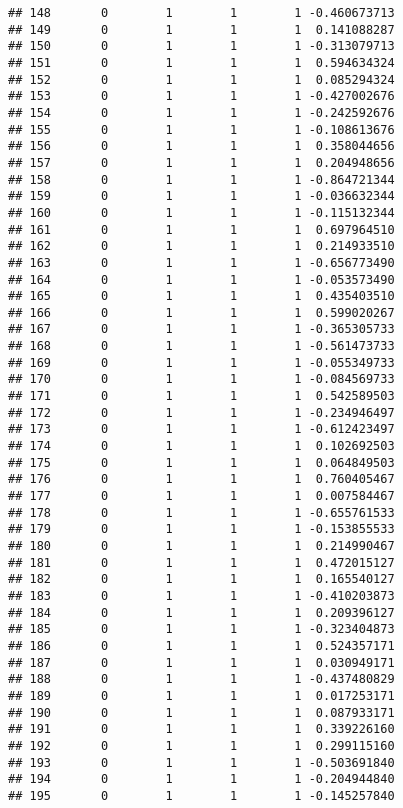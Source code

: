 \documentclass[]{book}
\theoremstyle{definition}
\theoremstyle{definition}
\theoremstyle{definition}
\theoremstyle{remark}
\begin{document}
\begin{verbatim}
## 148       0        1        1        1 -0.460673713
## 149       0        1        1        1  0.141088287
## 150       0        1        1        1 -0.313079713
## 151       0        1        1        1  0.594634324
## 152       0        1        1        1  0.085294324
## 153       0        1        1        1 -0.427002676
## 154       0        1        1        1 -0.242592676
## 155       0        1        1        1 -0.108613676
## 156       0        1        1        1  0.358044656
## 157       0        1        1        1  0.204948656
## 158       0        1        1        1 -0.864721344
## 159       0        1        1        1 -0.036632344
## 160       0        1        1        1 -0.115132344
## 161       0        1        1        1  0.697964510
## 162       0        1        1        1  0.214933510
## 163       0        1        1        1 -0.656773490
## 164       0        1        1        1 -0.053573490
## 165       0        1        1        1  0.435403510
## 166       0        1        1        1  0.599020267
## 167       0        1        1        1 -0.365305733
## 168       0        1        1        1 -0.561473733
## 169       0        1        1        1 -0.055349733
## 170       0        1        1        1 -0.084569733
## 171       0        1        1        1  0.542589503
## 172       0        1        1        1 -0.234946497
## 173       0        1        1        1 -0.612423497
## 174       0        1        1        1  0.102692503
## 175       0        1        1        1  0.064849503
## 176       0        1        1        1  0.760405467
## 177       0        1        1        1  0.007584467
## 178       0        1        1        1 -0.655761533
## 179       0        1        1        1 -0.153855533
## 180       0        1        1        1  0.214990467
## 181       0        1        1        1  0.472015127
## 182       0        1        1        1  0.165540127
## 183       0        1        1        1 -0.410203873
## 184       0        1        1        1  0.209396127
## 185       0        1        1        1 -0.323404873
## 186       0        1        1        1  0.524357171
## 187       0        1        1        1  0.030949171
## 188       0        1        1        1 -0.437480829
## 189       0        1        1        1  0.017253171
## 190       0        1        1        1  0.087933171
## 191       0        1        1        1  0.339226160
## 192       0        1        1        1  0.299115160
## 193       0        1        1        1 -0.503691840
## 194       0        1        1        1 -0.204944840
## 195       0        1        1        1 -0.145257840

\end{verbatim}
\end{document}
